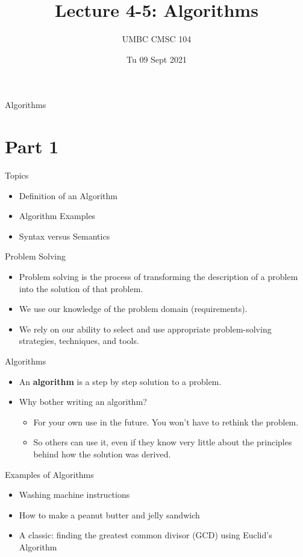\documentclass[graphics]{beamer}
\title{Lecture 4-5: Algorithms}
\author{UMBC CMSC 104}
\date{Tu 09 Sept 2021}
\begin{document}
\begin{frame}{}
\centering
    Algorithms
\end{frame}

\section*{Part 1}
\begin{frame}{Topics}
    \begin{itemize}
        \item Definition of an Algorithm
        \item Algorithm Examples
        \item Syntax versus Semantics
    \end{itemize}
\end{frame}

\begin{frame}{Problem Solving}
    \begin{itemize}
        \item Problem solving is the process of transforming the description of a problem into the solution of that problem.
        \item We use our knowledge of the problem domain (requirements).
        \item We rely on our ability to select and use appropriate problem-solving strategies, techniques, and tools.
    \end{itemize}
\end{frame}

\begin{frame}{Algorithms}
    \begin{itemize}
        \item An \textbf{algorithm} is a step by step solution to a problem.
        \item Why bother writing an algorithm?
        \begin{itemize}
            \item For your own use in the future.  You won’t have to rethink the problem.
            \item So others can use it, even if they know very little about the principles behind how the solution was derived.
        \end{itemize}
    \end{itemize}
\end{frame}

\begin{frame}{Examples of Algorithms}
    \begin{itemize}
        \item Washing machine instructions
        \item How to make a peanut butter and jelly sandwich
        \item A classic: finding the greatest common divisor (GCD) using Euclid’s Algorithm
    \end{itemize}
\end{frame}
\end{document}
